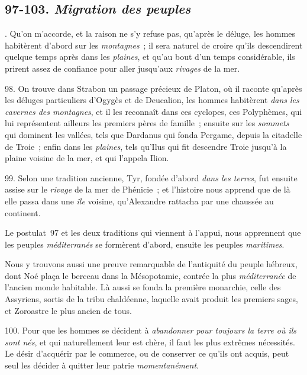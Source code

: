 \documentclass[french,twoside]{book} %
\begin{document}
\subsection[{97-103. Migration des peuples}]{ \textsc{97-103. } {\itshape Migration des peuples} }
. Qu’on m’accorde, et la raison ne s’y refuse pas, qu’après le déluge, les hommes habitèrent d’abord sur les {\itshape montagnes} ; il sera naturel de croire qu’ils descendirent quelque temps après dans les {\itshape plaines}, et qu’au bout d’un temps considérable, ils prirent assez de confiance pour aller jusqu’aux {\itshape rivages} de la mer.\par
98. On trouve dans Strabon un passage précieux  de Platon, où il raconte qu’après les déluges particuliers d’Ogygès et de Deucalion, les hommes habitèrent {\itshape dans les cavernes des montagnes}, et il les reconnaît dans ces cyclopes, ces Polyphèmes, qui lui représentent ailleurs les premiers pères de famille ; ensuite sur les {\itshape sommets} qui dominent les vallées, tels que Dardanus qui fonda Pergame, depuis la citadelle de Troie ; enfin dans les {\itshape plaines}, tels qu’Ilus qui fit descendre Troie jusqu’à la plaine voisine de la mer, et qui l’appela Ilion.\par
99. Selon une tradition ancienne, Tyr, fondée d’abord {\itshape dans les terres}, fut ensuite assise sur le {\itshape rivage} de la mer de Phénicie ; et l’histoire nous apprend que de là elle passa dans une {\itshape île} voisine, qu’Alexandre rattacha par une chaussée au continent.\par
Le postulat 97 et les deux traditions qui viennent à l’appui, nous apprennent que les peuples {\itshape méditerranés} se formèrent d’abord, ensuite les peuples {\itshape maritimes}.\par
Nous y trouvons aussi une preuve remarquable de l’antiquité du peuple hébreux, dont Noé plaça le berceau dans la Mésopotamie, contrée la plus {\itshape méditerranée} de l’ancien monde habitable. Là aussi se fonda la première monarchie, celle des Assyriens, sortis de la tribu chaldéenne, laquelle avait produit les premiers sages, et Zoroastre le plus ancien de tous.\par
100. Pour que les hommes se décident à {\itshape abandonner pour toujours la terre où ils sont nés}, et qui  naturellement leur est chère, il faut les plus extrêmes nécessités. Le désir d’acquérir par le commerce, ou de conserver ce qu’ils ont acquis, peut seul les décider à quitter leur patrie {\itshape momentanément}.\par
\end{document}
